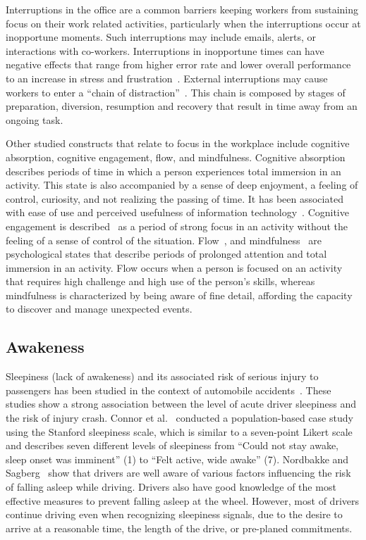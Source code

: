 Interruptions in the office are a common barriers keeping workers from sustaining focus on their work related activities, particularly when the interruptions occur at inopportune moments.
Such interruptions may include emails, alerts, or interactions with co-workers\cite{gonzalez2004constant,chong2006interruptions,shamsi07}. Interruptions in inopportune times can have negative effects that range from higher error rate and lower overall performance
to an increase in stress and frustration~\cite{bailey2001effects,czerwinski2000instant,mark2008cost}.
External interruptions may cause workers to enter a ``chain of distraction''~\cite{shamsi07}.
This chain is composed by stages of preparation, diversion, resumption and recovery that result in time away from an ongoing task. 

Other studied constructs that relate to focus in the workplace include cognitive absorption, cognitive engagement, flow, and mindfulness.
Cognitive absorption describes periods of time in which a person experiences total immersion in an activity.
This state is also accompanied by a sense of deep enjoyment, a feeling of control, curiosity, and not realizing the passing of time.
It has been associated with ease of use and perceived usefulness of information technology~\cite{agarwal00}.
Cognitive engagement is described~\cite{webster97} as a period of strong focus in an activity without the feeling of a sense of control of the situation.
Flow~\cite{Csikszentmihalyi90}, and mindfulness~\cite{Weick06,dane11} are psychological states that describe periods of prolonged attention and total immersion in an activity. Flow occurs when a person is focused on an activity that requires high challenge and high use of the person's skills, whereas mindfulness is characterized by being aware of fine detail, affording the capacity to discover and manage unexpected events.

\subsection{Awakeness}

Sleepiness (lack of awakeness) and its associated risk of serious injury to passengers has been studied in the context of automobile 
accidents~\cite{connor02,Nordbakke07}.
These studies show a strong association between the level of acute driver sleepiness and the risk of injury crash.
Connor et al.~\cite{connor02} conducted a population-based case study using the Stanford sleepiness scale, which is similar to a seven-point Likert scale and describes seven different levels of sleepiness from ``Could not stay awake, sleep onset was imminent'' (1) to ``Felt active, wide awake'' (7).
Nordbakke and Sagberg~\cite{Nordbakke07} show that drivers are well aware of  various factors influencing the risk of falling asleep while driving. Drivers also have good knowledge of the most effective measures to prevent falling asleep at the wheel.
However, most of drivers continue driving even when recognizing sleepiness signals, due to the desire to arrive at a reasonable time, the length of the drive, or pre-planed commitments.


